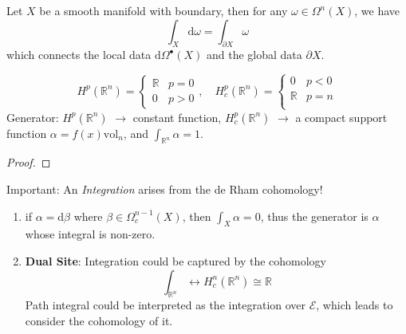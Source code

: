 \documentclass[10pt]{article}
\begin{document}
\begin{theorem}
  Let $ X$ be a smooth manifold with boundary, then for any $ \omega \in \Omega^{n}(X)$, we have
  \begin{equation*}
    \int_{X} \mathrm{d} \omega = \int _{\partial X} \omega
  \end{equation*}
  which connects the local data $ \mathrm{d} \Omega^{\bullet}(X)$ and the global data $\partial X$.
\end{theorem}
\begin{theorem}
  \begin{equation*}
    H^{p}(\mathbb{R}^{n}) =
    \begin{cases}
      \mathbb{R} & p = 0 \\
      0 & p > 0
    \end{cases}, \quad
    H^{p}_{c}(\mathbb{R}^{n}) =
    \begin{cases}
      0 & p <0 \\
      \mathbb{R} & p = n \\
    \end{cases}
  \end{equation*}
  Generator: $ H^{p}(\mathbb{R}^{n})$ $\rightarrow $ constant function, $ H^{p}_{c}(\mathbb{R}^{n})$ $\rightarrow $ a compact support function $ \alpha = f(x) \mathrm{vol}_{n}$, and $ \int _{\mathbb{R}^{n}} \alpha = 1$.
\end{theorem}
\begin{proof}

\end{proof}
Important: An \emph{Integration} arises from the de Rham cohomology!
\begin{observation}
  \begin{enumerate}[(1)]
    \item if $ \alpha = \mathrm{d} \beta$ where $ \beta \in \Omega_{c}^{n-1}(X)$, then $ \int _{X} \alpha = 0$, thus the generator is $ \alpha$ whose integral is non-zero.
    \item \textbf{Dual Site}: Integration could be captured by the cohomology
      \begin{equation*}
        \int _{\mathbb{R}^{n}} \leftrightarrow H^{n}_{c}(\mathbb{R}^{n}) \cong \mathbb{R}
      \end{equation*}
      Path integral could be interpreted as the integration over $ \mathcal{E}$, which leads to consider the cohomology of it.
  \end{enumerate}
\end{observation}
\end{document}
